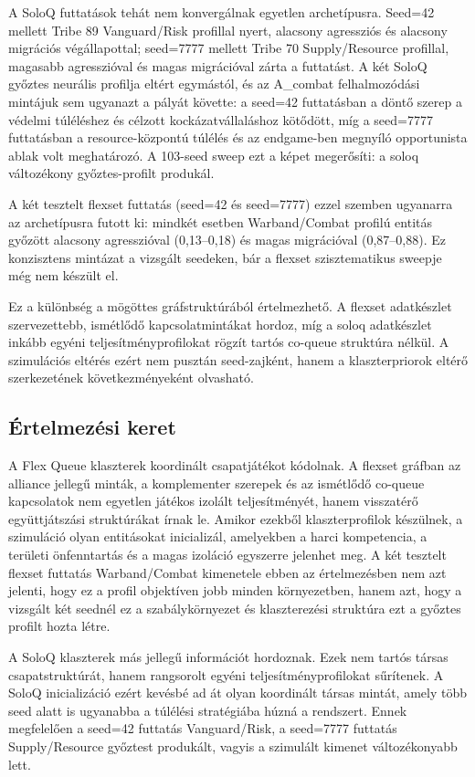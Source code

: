A SoloQ futtatások tehát nem konvergálnak egyetlen archetípusra. Seed=42 mellett Tribe 89 Vanguard/Risk profillal nyert, alacsony agressziós és alacsony migrációs végállapottal; seed=7777 mellett Tribe 70 Supply/Resource profillal, magasabb agresszióval és magas migrációval zárta a futtatást. A két SoloQ győztes neurális profilja eltért egymástól, és az A\_combat felhalmozódási mintájuk sem ugyanazt a pályát követte: a seed=42 futtatásban a döntő szerep a védelmi túléléshez és célzott kockázatvállaláshoz kötődött, míg a seed=7777 futtatásban a resource-központú túlélés és az endgame-ben megnyíló opportunista ablak volt meghatározó. A 103-seed sweep ezt a képet megerősíti: a soloq változékony győztes-profilt produkál.

A két tesztelt flexset futtatás (seed=42 és seed=7777) ezzel szemben ugyanarra az archetípusra futott ki: mindkét esetben Warband/Combat profilú entitás győzött alacsony agresszióval (0{,}13--0{,}18) és magas migrációval (0{,}87--0{,}88). Ez konzisztens mintázat a vizsgált seedeken, bár a flexset szisztematikus sweepje még nem készült el.

Ez a különbség a mögöttes gráfstruktúrából értelmezhető. A flexset adatkészlet szervezettebb, ismétlődő kapcsolatmintákat hordoz, míg a soloq adatkészlet inkább egyéni teljesítményprofilokat rögzít tartós co-queue struktúra nélkül. A szimulációs eltérés ezért nem pusztán seed-zajként, hanem a klaszterpriorok eltérő szerkezetének következményeként olvasható.

\subsection*{Értelmezési keret}

A Flex Queue klaszterek koordinált csapatjátékot kódolnak. A flexset gráfban az alliance jellegű minták, a komplementer szerepek és az ismétlődő co-queue kapcsolatok nem egyetlen játékos izolált teljesítményét, hanem visszatérő együttjátszási struktúrákat írnak le. Amikor ezekből klaszterprofilok készülnek, a szimuláció olyan entitásokat inicializál, amelyekben a harci kompetencia, a területi önfenntartás és a magas izoláció egyszerre jelenhet meg. A két tesztelt flexset futtatás Warband/Combat kimenetele ebben az értelmezésben nem azt jelenti, hogy ez a profil objektíven jobb minden környezetben, hanem azt, hogy a vizsgált két seednél ez a szabálykörnyezet és klaszterezési struktúra ezt a győztes profilt hozta létre.

A SoloQ klaszterek más jellegű információt hordoznak. Ezek nem tartós társas csapatstruktúrát, hanem rangsorolt egyéni teljesítményprofilokat sűrítenek. A SoloQ inicializáció ezért kevésbé ad át olyan koordinált társas mintát, amely több seed alatt is ugyanabba a túlélési stratégiába húzná a rendszert. Ennek megfelelően a seed=42 futtatás Vanguard/Risk, a seed=7777 futtatás Supply/Resource győztest produkált, vagyis a szimulált kimenet változékonyabb lett.

